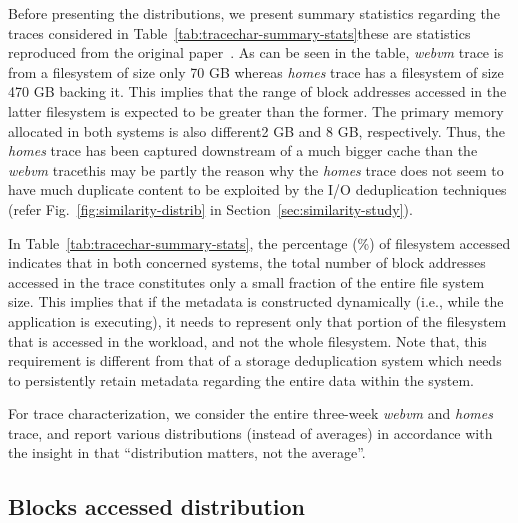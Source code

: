 Before presenting the distributions, we present summary
statistics regarding the traces considered in 
Table~\ref{tab:tracechar-summary-stats}\textemdash{}these are statistics reproduced
from the original paper~\cite{iodedup}.
As can be seen in the table, \textit{webvm} trace is from a filesystem of size only 70 GB
whereas \textit{homes} trace has a filesystem of size 470 GB backing it. This implies
that the range of block addresses accessed in the latter filesystem is expected
to be greater than the former. The primary memory allocated in both systems
is also different\textemdash{}2 GB and 8 GB, respectively. Thus, the \textit{homes} trace
has been captured downstream of a much bigger cache than the \textit{webvm}
trace\textemdash{}this may be partly the reason why the \textit{homes} trace does not
seem to have much duplicate content to be exploited by the I/O deduplication
techniques (refer Fig.~\ref{fig:similarity-distrib} in Section~\ref{sec:similarity-study}).

In Table~\ref{tab:tracechar-summary-stats}, the percentage (\%) of 
filesystem accessed indicates that in both concerned systems, 
the total number of block addresses accessed in the trace constitutes only
a small fraction of the entire file system size. This implies that if the
metadata is constructed dynamically (i.e., while the application is 
executing), it needs to represent only that portion
of the filesystem that is accessed in the workload, and not the whole filesystem.
Note that, this requirement is different from that of a storage deduplication
system which needs to persistently retain metadata regarding the entire data
within the system.


 
For trace characterization, we consider the entire three-week \textit{webvm}
and \textit{homes} trace, and report various distributions (instead
of averages) in accordance with the insight in 
\cite{commercial-characterization} that ``distribution matters, not 
the average''. 

\subsection{Blocks accessed distribution}

